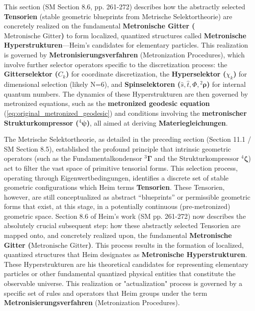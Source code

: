 \documentclass[12pt]{article}
\newcommand{\q}[1]{\enquote{#1}}
\newcommand{\fundamentalkondensor}{{}^3\bm{\Gamma}}
\newcommand{\metronischegitter}{\text{Metronische Gitter}}
\newcommand{\strukturkompressor}{{}^4\bm{\zeta}}
\newcommand{\metronischerstrukturkompressor}{{}^4\bm{\psi}} %
\begin{document}
This section (SM Section 8.6, pp. 261-272) describes how the abstractly selected \textbf{Tensorien} (stable geometric blueprints from Metrische Selektortheorie) are concretely realized on the fundamental \textbf{Metronische Gitter (\(\metronischegitter\))} to form localized, quantized structures called \textbf{Metronische Hyperstrukturen}—Heim's candidates for elementary particles. This realization is governed by \textbf{Metronisierungsverfahren} (Metronization Procedures), which involve further selector operators specific to the discretization process: the \textbf{Gitterselektor (\(C_k\))} for coordinate discretization, the \textbf{Hyperselektor (\(\chi_k\))} for dimensional selection (likely N=6), and \textbf{Spinselektoren (\(\hat{s}, \hat{t}, \hat{\Phi}, {}^2\bm{\rho}\))} for internal quantum numbers. The dynamics of these Hyperstrukturen are then governed by metronized equations, such as the \textbf{metronized geodesic equation} (\eqref{eq:original_metronized_geodesic}) and conditions involving the \textbf{metronischer Strukturkompressor (\(\metronischerstrukturkompressor\))}, all aimed at deriving \textbf{Materiegleichungen}.

The Metrische Selektortheorie, as detailed in the preceding section (Section 11.1 / SM Section 8.5), established the profound principle that intrinsic geometric operators (such as the Fundamentalkondensor \( \fundamentalkondensor \) and the Strukturkompressor \( \strukturkompressor \)) act to filter the vast space of primitive tensorial forms. This selection process, operating through Eigenwertbedingungen, identifies a discrete set of stable geometric configurations which Heim terms \textbf{Tensorien}. These Tensorien, however, are still conceptualized as abstract \q{blueprints} or permissible geometric forms that exist, at this stage, in a potentially continuous (pre-metronized) geometric space. Section 8.6 of Heim's work (SM pp. 261-272) now describes the absolutely crucial subsequent step: how these abstractly selected Tensorien are mapped onto, and concretely realized upon, the fundamental \textbf{Metronische Gitter (\(\metronischegitter\))}. This process results in the formation of localized, quantized structures that Heim designates as \textbf{Metronische Hyperstrukturen}. These Hyperstrukturen are his theoretical candidates for representing elementary particles or other fundamental quantized physical entities that constitute the observable universe. This realization or "actualization" process is governed by a specific set of rules and operators that Heim groups under the term \textbf{Metronisierungsverfahren} (Metronization Procedures).
\end{document}

